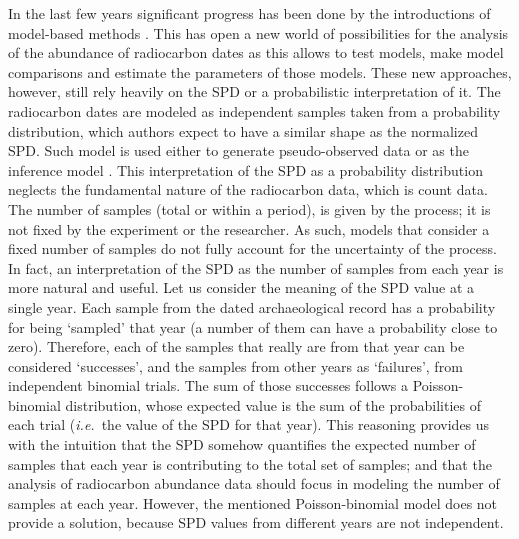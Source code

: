 \documentclass[a4paper]{article}
\begin{document}
In the last few years significant progress has been done by the introductions of model-based methods \parencite[reviewed by][]{Crema2022}. This has open a new world of possibilities for the analysis of the abundance of radiocarbon dates as this allows to test models, make model comparisons and estimate the parameters of those models. These new approaches, however, still rely heavily on the SPD or a probabilistic interpretation of it. The radiocarbon dates are modeled as independent samples taken from a probability distribution, which authors expect to have a similar shape as the normalized SPD. Such model is used either to generate pseudo-observed data or as the inference model \parencite{Porcic2020, Carleton2021b, Crema2021b, Timpson2020}. This interpretation of the SPD as a probability distribution neglects the fundamental nature of the radiocarbon data, which is count data. The number of samples (total or within a period), is given by the process; it is not fixed by the experiment or the researcher. As such, models that consider a fixed number of samples do not fully account for the uncertainty of the process.
\\
 

In fact, an interpretation of the SPD as the number of samples from each year is more natural and useful. Let us consider the meaning of the SPD value at a single year. Each sample from the dated archaeological record has a probability for being `sampled' that year (a number of them can have a probability close to zero). Therefore, each of the samples that really are from that year can be considered `successes', and the samples from other years as `failures', from independent binomial trials. The sum of those successes follows a Poisson-binomial distribution, whose expected value is the sum of the probabilities of each trial (\emph{i.e.}\ the value of the SPD for that year). This reasoning provides us with the intuition that the SPD somehow quantifies the expected number of samples that each year is contributing to the total set of samples; and that the analysis of radiocarbon abundance data should focus in modeling the number of samples at each year. However, the mentioned Poisson-binomial model does not provide a solution, because SPD values from different years are not independent.
\\
\end{document}
